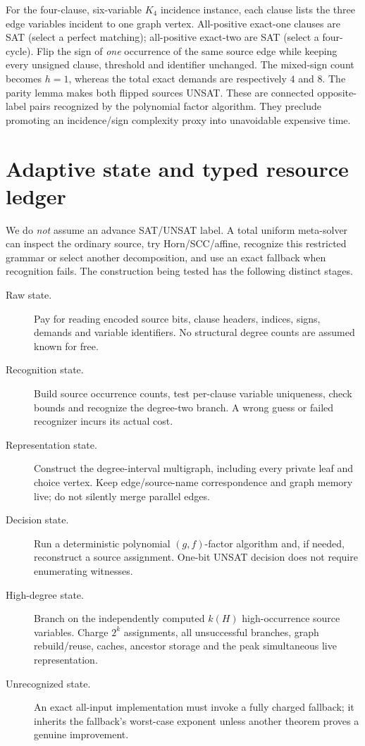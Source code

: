 \documentclass[11pt]{article}
\begin{document}
For the four-clause, six-variable \(K_4\) incidence instance, each clause
lists the three edge variables incident to one graph vertex. All-positive
exact-one clauses are SAT (select a perfect matching); all-positive
exact-two are SAT (select a four-cycle). Flip the sign of \emph{one}
occurrence of the same source edge while keeping every unsigned clause,
threshold and identifier unchanged. The mixed-sign count becomes \(h=1\),
whereas the total exact demands are respectively \(4\) and \(8\).
The parity lemma makes both flipped sources UNSAT.
These are connected opposite-label pairs recognized by the polynomial
factor algorithm. They preclude promoting an incidence/sign complexity
proxy into unavoidable expensive time.

\section{Adaptive state and typed resource ledger}
We do \emph{not} assume an advance SAT/UNSAT label. A total uniform
meta-solver can inspect the ordinary source, try Horn/SCC/affine,
recognize this restricted grammar or select another decomposition,
and use an exact fallback when recognition fails.
The construction being tested has the following distinct stages.
\begin{description}
\item[Raw state.] Pay for reading encoded source bits, clause headers,
indices, signs, demands and variable identifiers. No structural degree
counts are assumed known for free.
\item[Recognition state.] Build source occurrence counts, test per-clause
variable uniqueness, check bounds and recognize the degree-two branch.
A wrong guess or failed recognizer incurs its actual cost.
\item[Representation state.] Construct the degree-interval multigraph,
including every private leaf and choice vertex. Keep edge/source-name
correspondence and graph memory live; do not silently merge parallel edges.
\item[Decision state.] Run a deterministic polynomial \((g,f)\)-factor
algorithm and, if needed, reconstruct a source assignment. One-bit UNSAT
decision does not require enumerating witnesses.
\item[High-degree state.] Branch on the independently computed \(k(H)\)
high-occurrence source variables. Charge \(2^k\) assignments, all
unsuccessful branches, graph rebuild/reuse, caches, ancestor storage and
the peak simultaneous live representation.
\item[Unrecognized state.] An exact all-input implementation must invoke
a fully charged fallback; it inherits the fallback's worst-case exponent
unless another theorem proves a genuine improvement.
\end{description}
\end{document}
